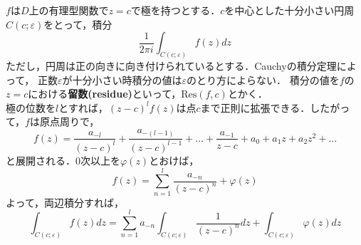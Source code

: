 $f$は$D$上の有理型関数で$z = c$で極を持つとする．$c$を中心とした十分小さい円周$C(c;\varepsilon)$をとって，積分
\begin{equation}
  \frac{1}{2\pi i}\int_{C(c;\varepsilon)}f(z)dz
\end{equation}
ただし，円周は正の向きに向き付けられているとする．Cauchyの積分定理によって，
正数$\varepsilon$が十分小さい時積分の値は$\varepsilon$のとり方によらない．
積分の値を$f$の$z = c$における\textbf{留数(residue)}といって，$\text{Res}(f,c)$とかく．\\
極の位数を$l$とすれば，$(z - c)^{l}f(z)$は点$c$まで正則に拡張できる．したがって，$f$は原点周りで，
\begin{equation}
  f(z) = \frac{a_{-l}}{(z - c)^{l}} + \frac{a_{-(l - 1)}}{(z - c)^{l - 1}} + \dots + \frac{a_{-1}}{z - c} + a_{0} + a_{1}z + a_{2}z^{2} + \dots
\end{equation}
と展開される．$0$次以上を$\varphi(z)$とおけば，
\begin{equation}
  f(z) = \sum_{n = 1}^{l}\frac{a_{-n}}{(z - c)^{n}} + \varphi(z)
\end{equation}
よって，両辺積分すれば，
\begin{equation}
  \int_{C(c;\varepsilon)}f(z)dz = \sum_{n = 1}^{l}a_{-n}\int_{C(c;\varepsilon)}\frac{1}{(z - c)^{n}}dz + \int_{C(c;\varepsilon)}\varphi(z)dz
\end{equation}
